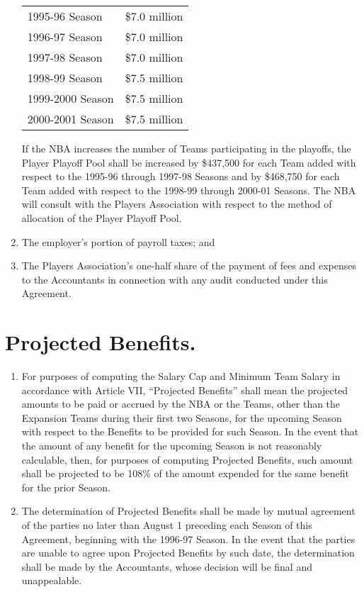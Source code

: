 \documentclass[
]{book}
\providecommand{\tightlist}{%
  \setlength{\itemsep}{0pt}\setlength{\parskip}{0pt}}
\begin{document}
\begin{enumerate}
  \begin{longtable}[]{@{}lc@{}}
  \toprule()
  \endhead
  1995-96 Season & \$7.0 million \\
  1996-97 Season & \$7.0 million \\
  1997-98 Season & \$7.0 million \\
  1998-99 Season & \$7.5 million \\
  1999-2000 Season & \$7.5 million \\
  2000-2001 Season & \$7.5 million \\
  \bottomrule()
  \end{longtable}

  If the NBA increases the number of Teams participating in the playoffs, the Player Playoff Pool shall be increased by \$437,500 for each Team added with respect to the 1995-96 through 1997-98 Seasons and by \$468,750 for each Team added with respect to the 1998-99 through 2000-01 Seasons. The NBA will consult with the Players Association with respect to the method of allocation of the Player Playoff Pool.
\item
  The employer's portion of payroll taxes; and
\item
  The Players Association's one-half share of the payment of fees and expenses to the Accountants in connection with any audit conducted under this Agreement.
\end{enumerate}

\hypertarget{projected-benefits.}{%
\section{Projected Benefits.}\label{projected-benefits.}}

\begin{enumerate}
\def\labelenumi{(\alph{enumi})}
\tightlist
\item
  For purposes of computing the Salary Cap and Minimum Team Salary in accordance with Article VII, ``Projected Benefits'' shall mean the projected amounts to be paid or accrued by the NBA or the Teams, other than the Expansion Teams during their first two Seasons, for the upcoming Season with respect to the Benefits to be provided for such Season. In the event that the amount of any benefit for the upcoming Season is not reasonably calculable, then, for purposes of computing Projected Benefits, such amount shall be projected to be 108\% of the amount expended for the same benefit for the prior Season.
\item
  The determination of Projected Benefits shall be made by mutual agreement of the parties no later than August 1 preceding each Season of this Agreement, beginning with the 1996-97 Season. In the event that the parties are unable to agree upon Projected Benefits by such date, the determination shall be made by the Accountants, whose decision will be final and unappealable.
\end{enumerate}
\end{document}
